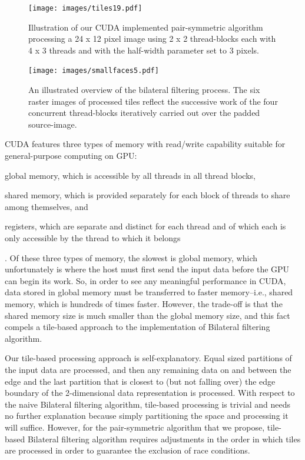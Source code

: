 \documentclass{IEEEtran}
\begin{document}
\begin{figure}
\texttt{[image: images/tiles19.pdf]}
\caption{Illustration of our CUDA implemented pair-symmetric algorithm processing a 24 x 12 pixel image using 2 x 2 thread-blocks each with 4 x 3 threads and with the half-width parameter set to 3 pixels.}
\label{fig:pspro}
\end{figure}

\begin{figure}
\texttt{[image: images/smallfaces5.pdf]}
\caption{An illustrated overview of the bilateral filtering process. The six raster images of processed tiles reflect the successive work of the four concurrent thread-blocks iteratively carried out over the padded source-image.}
\label{fig:pspro}
\end{figure}

CUDA features three types of memory with read/write capability suitable for general-purpose computing on GPU: \begin{inparaenum}[(i)] \item global memory, which is accessible by all threads in all thread blocks, \item shared memory, which is provided separately for each block of threads to share among themselves, and \item registers, which are separate and distinct for each thread and of which each is only accessible by the thread to which it belongs\end{inparaenum}. Of these three types of memory, the slowest is global memory, which unfortunately is where the host must first send the input data before the GPU can begin its work. So, in order to see any meaningful performance in CUDA, data stored in global memory must be transferred to faster memory--i.e., shared memory, which is hundreds of times faster. However, the trade-off is that the shared memory size is much smaller than the global memory size, and this fact compels a tile-based approach to the implementation of Bilateral filtering algorithm.

Our tile-based processing approach is self-explanatory. Equal sized partitions of the input data are processed, and then any remaining data on and between the edge and the last partition that is closest to (but not falling over) the edge boundary of the 2-dimensional data representation is processed. With respect to the naive Bilateral filtering algorithm, tile-based processing is trivial and needs no further explanation because simply partitioning the space and processing it will suffice. However, for the pair-symmetric algorithm that we propose, tile-based Bilateral filtering algorithm requires adjustments in the order in which tiles are processed in order to guarantee the exclusion of race conditions. 
\end{document}
